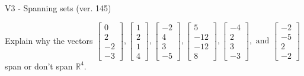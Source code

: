 \begin{exercise}
  \begin{exerciseTitle}V3 - Spanning sets (ver. 145)\end{exerciseTitle}
  \begin{exerciseStatement}
    Explain why the vectors \(\left[\begin{array}{r}
0 \\
2 \\
-2 \\
-3
\end{array}\right] , \left[\begin{array}{r}
1 \\
2 \\
1 \\
4
\end{array}\right] , \left[\begin{array}{r}
-2 \\
4 \\
3 \\
-5
\end{array}\right] , \left[\begin{array}{r}
5 \\
-12 \\
-12 \\
8
\end{array}\right] , \left[\begin{array}{r}
-4 \\
2 \\
3 \\
-3
\end{array}\right] , \text{ and } \left[\begin{array}{r}
-2 \\
-5 \\
2 \\
-2
\end{array}\right]\) span or don't span \(\mathbb{R}^4\). 
	



\end{exerciseStatement}
\end{exercise}
